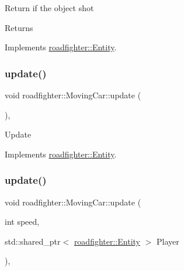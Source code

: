 Return if the object shot \begin{DoxyReturn}{Returns}

\end{DoxyReturn}


Implements \hyperlink{classroadfighter_1_1Entity_ad0ecaa0539db252e591da83814251509}{roadfighter\+::\+Entity}.

\mbox{\label{classroadfighter_1_1MovingCar_a06c6e2e0510707bdd7e4570b8f65241c}} 
\subsubsection{\texorpdfstring{update()}{update()}\hspace{0.1cm}{\footnotesize\ttfamily [1/2]}}
{\footnotesize\ttfamily void roadfighter\+::\+Moving\+Car\+::update (\begin{DoxyParamCaption}{ }\end{DoxyParamCaption})\hspace{0.3cm}{\ttfamily [override]}, {\ttfamily [virtual]}}

Update 

Implements \hyperlink{classroadfighter_1_1Entity_a19cd353f12a3e8432acd6d5609137561}{roadfighter\+::\+Entity}.

\mbox{\label{classroadfighter_1_1MovingCar_a62fbe61c5a1c1a1c0d376047ec1edcf2}} 
\subsubsection{\texorpdfstring{update()}{update()}\hspace{0.1cm}{\footnotesize\ttfamily [2/2]}}
{\footnotesize\ttfamily void roadfighter\+::\+Moving\+Car\+::update (\begin{DoxyParamCaption}\item[{int}]{speed,  }\item[{std\+::shared\+\_\+ptr$<$ \hyperlink{classroadfighter_1_1Entity}{roadfighter\+::\+Entity} $>$}]{Player }\end{DoxyParamCaption})\hspace{0.3cm}{\ttfamily [override]}, {\ttfamily [virtual]}}

